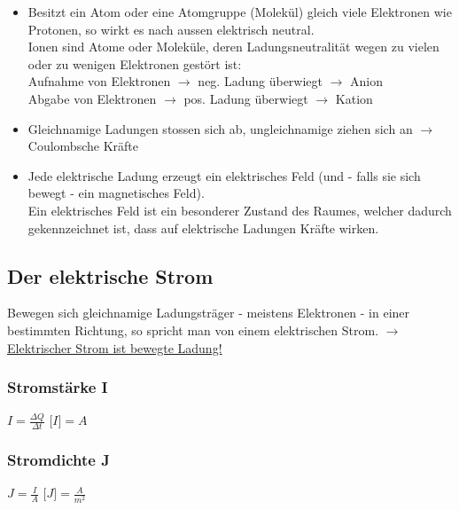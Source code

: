 \begin{itemize}
	\item Besitzt ein Atom oder eine Atomgruppe (Molekül) gleich viele Elektronen wie Protonen, so wirkt es nach aussen elektrisch neutral.\\
				Ionen sind Atome oder Moleküle, deren Ladungsneutralität wegen zu vielen oder zu wenigen Elektronen gestört ist:\\
				Aufnahme von Elektronen $\rightarrow$ neg. Ladung überwiegt $\rightarrow$ Anion\\
				Abgabe von Elektronen $\rightarrow$ pos. Ladung überwiegt $\rightarrow$ Kation\\
	\item Gleichnamige Ladungen stossen sich ab, ungleichnamige ziehen sich an $\rightarrow$ Coulombsche Kräfte 
	\item Jede elektrische Ladung erzeugt ein elektrisches Feld (und - falls sie sich bewegt - ein magnetisches Feld).\\
				Ein elektrisches Feld ist ein besonderer Zustand des Raumes, welcher dadurch gekennzeichnet ist, dass auf elektrische Ladungen Kräfte wirken.
\end{itemize}

\subsection{Der elektrische Strom}
Bewegen sich gleichnamige Ladungsträger - meistens Elektronen - in einer bestimmten Richtung, so spricht man von einem elektrischen Strom.
$\rightarrow$ \underline{Elektrischer Strom ist bewegte Ladung!}\\
\begin{multicols}{2}
	\subsubsection{Stromstärke I}
	$ I=\frac{\Delta Q}{\Delta t}$ \hspace{10pt}  $\lbrack I \rbrack = A $\\
	\subsubsection{Stromdichte J}
	$ J=\frac {I}{A}$  \hspace{10pt}  $\lbrack J \rbrack = \frac {A}{m^2} $\\
\end{multicols}
